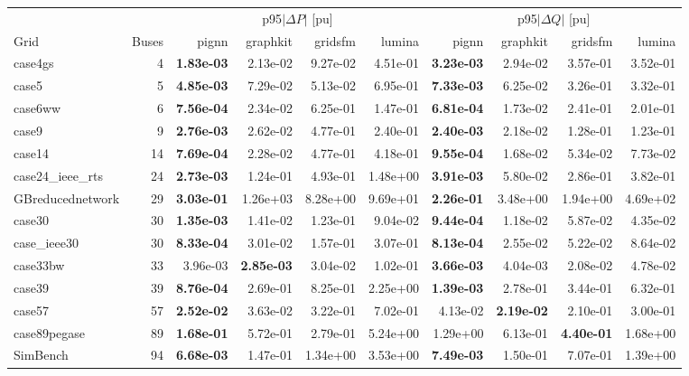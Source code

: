 \documentclass[10pt]{article}
\begin{document}
\begin{table}[H]
\centering\small
\begin{tabular}{lr rrrr rrrr}
\toprule
 & & \multicolumn{4}{c}{p95$|\Delta P|$ [pu]} & \multicolumn{4}{c}{p95$|\Delta Q|$ [pu]} \\
\cmidrule(lr){3-6}\cmidrule(lr){7-10}
Grid & Buses & pignn & graphkit & gridsfm & lumina & pignn & graphkit & gridsfm & lumina \\
\midrule
case4gs & 4 & \textbf{1.83e-03} & 2.13e-02 & 9.27e-02 & 4.51e-01 & \textbf{3.23e-03} & 2.94e-02 & 3.57e-01 & 3.52e-01 \\
case5 & 5 & \textbf{4.85e-03} & 7.29e-02 & 5.13e-02 & 6.95e-01 & \textbf{7.33e-03} & 6.25e-02 & 3.26e-01 & 3.32e-01 \\
case6ww & 6 & \textbf{7.56e-04} & 2.34e-02 & 6.25e-01 & 1.47e-01 & \textbf{6.81e-04} & 1.73e-02 & 2.41e-01 & 2.01e-01 \\
case9 & 9 & \textbf{2.76e-03} & 2.62e-02 & 4.77e-01 & 2.40e-01 & \textbf{2.40e-03} & 2.18e-02 & 1.28e-01 & 1.23e-01 \\
case14 & 14 & \textbf{7.69e-04} & 2.28e-02 & 4.77e-01 & 4.18e-01 & \textbf{9.55e-04} & 1.68e-02 & 5.34e-02 & 7.73e-02 \\
case24\_ieee\_rts & 24 & \textbf{2.73e-03} & 1.24e-01 & 4.93e-01 & 1.48e+00 & \textbf{3.91e-03} & 5.80e-02 & 2.86e-01 & 3.82e-01 \\
GBreducednetwork & 29 & \textbf{3.03e-01} & 1.26e+03 & 8.28e+00 & 9.69e+01 & \textbf{2.26e-01} & 3.48e+00 & 1.94e+00 & 4.69e+02 \\
case30 & 30 & \textbf{1.35e-03} & 1.41e-02 & 1.23e-01 & 9.04e-02 & \textbf{9.44e-04} & 1.18e-02 & 5.87e-02 & 4.35e-02 \\
case\_ieee30 & 30 & \textbf{8.33e-04} & 3.01e-02 & 1.57e-01 & 3.07e-01 & \textbf{8.13e-04} & 2.55e-02 & 5.22e-02 & 8.64e-02 \\
case33bw & 33 & 3.96e-03 & \textbf{2.85e-03} & 3.04e-02 & 1.02e-01 & \textbf{3.66e-03} & 4.04e-03 & 2.08e-02 & 4.78e-02 \\
case39 & 39 & \textbf{8.76e-04} & 2.69e-01 & 8.25e-01 & 2.25e+00 & \textbf{1.39e-03} & 2.78e-01 & 3.44e-01 & 6.32e-01 \\
case57 & 57 & \textbf{2.52e-02} & 3.63e-02 & 3.22e-01 & 7.02e-01 & 4.13e-02 & \textbf{2.19e-02} & 2.10e-01 & 3.00e-01 \\
case89pegase & 89 & \textbf{1.68e-01} & 5.72e-01 & 2.79e-01 & 5.24e+00 & 1.29e+00 & 6.13e-01 & \textbf{4.40e-01} & 1.68e+00 \\
SimBench & 94 & \textbf{6.68e-03} & 1.47e-01 & 1.34e+00 & 3.53e+00 & \textbf{7.49e-03} & 1.50e-01 & 7.07e-01 & 1.39e+00 \\

\end{tabular}
\end{table}
\end{document}
